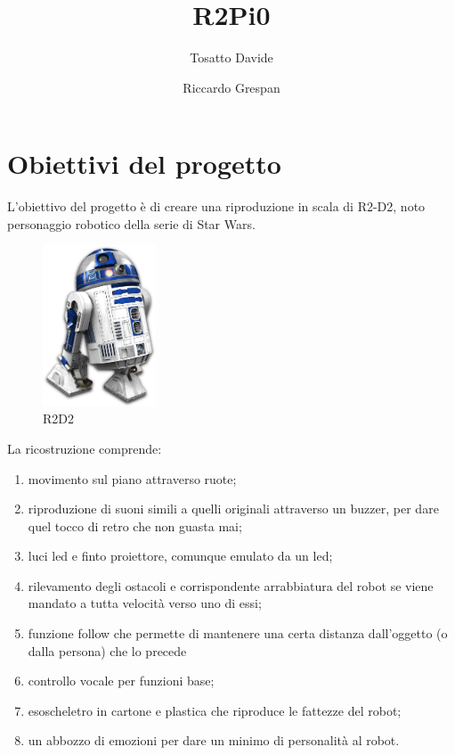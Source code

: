 \documentclass[12pt]{article}
\title{R2Pi0}
\author{
  Tosatto Davide
  \and
  Riccardo Grespan
}
\newcommand{\imgsz}{0.3\textwidth}
\begin{document}
 
\maketitle
\newpage
\tableofcontents
\newpage

\section{Obiettivi del progetto}
L'obiettivo del progetto è di creare una riproduzione in scala di R2-D2, noto personaggio robotico della serie di Star Wars.

\begin{figure}[h]
\includegraphics[width=\imgsz]{R2D2}
\centering
\caption{R2D2}
\label{fig:R2D2}
\end{figure}

La ricostruzione comprende:
\begin{enumerate}
\item movimento sul piano attraverso ruote;
\item riproduzione di suoni simili a quelli originali attraverso un buzzer, per dare quel tocco di retro che non guasta mai;
\item luci led e finto proiettore, comunque emulato da un led;
\item rilevamento degli ostacoli e corrispondente arrabbiatura del robot se viene mandato a tutta velocità verso uno di essi;
\item funzione follow che permette di mantenere una certa distanza dall'oggetto (o dalla persona) che lo precede
\item controllo vocale per funzioni base;
\item esoscheletro in cartone e plastica che riproduce le fattezze del robot;
\item un abbozzo di emozioni per dare un minimo di personalità al robot.
\end{enumerate}
\end{document}
